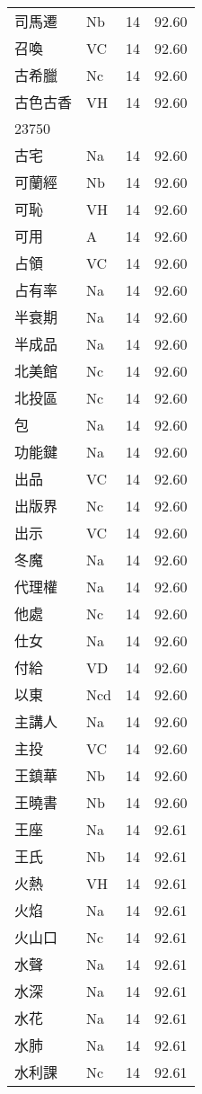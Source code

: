 \documentclass[twocolumn]{book}
\begin{document}
\begin{supertabular}{llrr}
司馬遷 & Nb & 14 &  92.60\\
召喚 & VC & 14 &  92.60\\
古希臘 & Nc & 14 &  92.60\\
古色古香 & VH & 14 &  92.60\\
23750\\
古宅 & Na & 14 &  92.60\\
可蘭經 & Nb & 14 &  92.60\\
可恥 & VH & 14 &  92.60\\
可用 & A & 14 &  92.60\\
占領 & VC & 14 &  92.60\\
占有率 & Na & 14 &  92.60\\
半衰期 & Na & 14 &  92.60\\
半成品 & Na & 14 &  92.60\\
北美館 & Nc & 14 &  92.60\\
北投區 & Nc & 14 &  92.60\\
包 & Na & 14 &  92.60\\
功能鍵 & Na & 14 &  92.60\\
出品 & VC & 14 &  92.60\\
出版界 & Nc & 14 &  92.60\\
出示 & VC & 14 &  92.60\\
冬魔 & Na & 14 &  92.60\\
代理權 & Na & 14 &  92.60\\
他處 & Nc & 14 &  92.60\\
仕女 & Na & 14 &  92.60\\
付給 & VD & 14 &  92.60\\
以東 & Ncd & 14 &  92.60\\
主講人 & Na & 14 &  92.60\\
主投 & VC & 14 &  92.60\\
王鎮華 & Nb & 14 &  92.60\\
王曉書 & Nb & 14 &  92.60\\
王座 & Na & 14 &  92.61\\
王氏 & Nb & 14 &  92.61\\
火熱 & VH & 14 &  92.61\\
火焰 & Na & 14 &  92.61\\
火山口 & Nc & 14 &  92.61\\
水聲 & Na & 14 &  92.61\\
水深 & Na & 14 &  92.61\\
水花 & Na & 14 &  92.61\\
水肺 & Na & 14 &  92.61\\
水利課 & Nc & 14 &  92.61\\

\end{supertabular}
\end{document}
